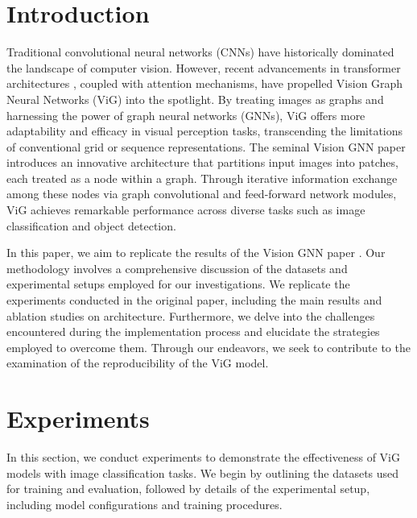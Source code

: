 \documentclass[sigconf, nonacm]{acmart}
\newcommand\vldbavailabilityurl{https://github.com/mirzaim/VisionGNN}
\begin{document}

\section{Introduction}

Traditional convolutional neural networks (CNNs) have historically dominated the landscape of computer vision. However, recent advancements in transformer architectures \cite{attentionisallyouneed, ViT}, coupled with attention mechanisms, have propelled Vision Graph Neural Networks (ViG) \cite{visiongnn} into the spotlight. By treating images as graphs and harnessing the power of graph neural networks (GNNs), ViG offers more adaptability and efficacy in visual perception tasks, transcending the limitations of conventional grid or sequence representations. The seminal Vision GNN paper \cite{visiongnn} introduces an innovative architecture that partitions input images into patches, each treated as a node within a graph. Through iterative information exchange among these nodes via graph convolutional and feed-forward network modules, ViG achieves remarkable performance across diverse tasks such as image classification and object detection.

In this paper, we aim to replicate the results of the Vision GNN paper \cite{visiongnn}. Our methodology involves a comprehensive discussion of the datasets and experimental setups employed for our investigations. We replicate the experiments conducted in the original paper, including the main results and ablation studies on architecture. Furthermore, we delve into the challenges encountered during the implementation process and elucidate the strategies employed to overcome them. Through our endeavors, we seek to contribute to the examination of the reproducibility of the ViG model.

\section{Experiments}
In this section, we conduct experiments to demonstrate the effectiveness of ViG models with image classification tasks. We begin by outlining the datasets used for training and evaluation, followed by details of the experimental setup, including model configurations and training procedures.
\end{document}
